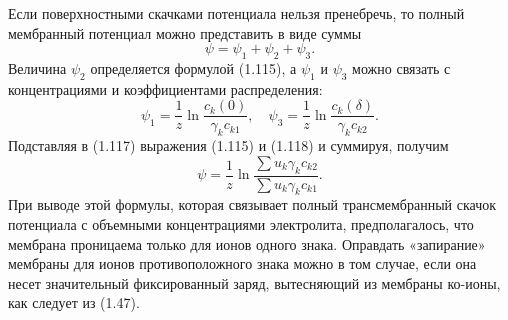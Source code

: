 Если поверхностными скачками потенциала нельзя пренебречь, то полный мембранный
потенциал можно представить в виде суммы
\begin{equation}
    \psi = \psi_1 + \psi_2 + \psi_3.
\end{equation}
Величина \( \psi_2 \) определяется формулой (1.115), а \( \psi_1 \) и
\( \psi_3 \) можно связать с концентрациями и коэффициентами распределения:
\begin{equation}
    \psi_1 = \frac{1}{z}\ln\frac{c_k(0)}{\gamma_k c_{k1}},\quad
    \psi_3 = \frac{1}{z}\ln\frac{c_k(\delta)}{\gamma_k c_{k2}}.
\end{equation}
Подставляя в (1.117) выражения (1.115) и (1.118) и суммируя, получим
\begin{equation}
    \psi =\frac{1}{z}
        \ln\frac{\sum u_k \gamma_k c_{k2}}{\sum u_k \gamma_k c_{k1}}.
\end{equation}
При выводе этой формулы, которая связывает полный трансмембранный скачок
потенциала с объемными концентрациями электролита, предполагалось, что мембрана
проницаема только для ионов одного знака. Оправдать «запирание» мембраны для
ионов противоположного знака можно в том случае, если она несет значительный
фиксированный заряд, вытесняющий из мембраны ко-ионы, как следует из (1.47).

